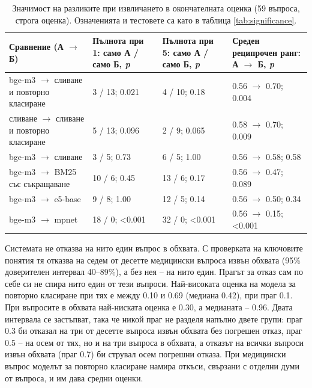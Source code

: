\documentclass[12pt,a4paper]{article}
\makeatletter
\renewcommand\paragraph{\@startsection{paragraph}{4}{\z@}{1.5ex \@plus .5ex \@minus .2ex}{-1em}{\normalfont\normalsize\bfseries}}
\makeatother
\begin{document}
\begin{table}[ht]
\centering
\small
\caption{Значимост на разликите при извличането в окончателната оценка (59 въпроса, строга оценка). Означенията и тестовете са като в таблица \ref{tab:significance}.}
\label{tab:final-significance}
\setlength{\tabcolsep}{4pt}
\begin{tabular}{L{0.36\textwidth}C{0.17\textwidth}C{0.17\textwidth}C{0.2\textwidth}}
\toprule
Сравнение (А $\rightarrow$ Б) & Пълнота при 1: само А / само Б, \textit{p} & Пълнота при 5: само А / само Б, \textit{p} & Среден реципрочен ранг: А $\rightarrow$ Б, \textit{p}\\
\midrule
bge-m3 $\rightarrow$ сливане и повторно класиране & 3 / 13; 0.021 & 4 / 10; 0.18 & 0.56 $\rightarrow$ 0.70; 0.004\\
сливане $\rightarrow$ сливане и повторно класиране & 5 / 13; 0.096 & 2 / 9; 0.065 & 0.58 $\rightarrow$ 0.70; 0.009\\
bge-m3 $\rightarrow$ сливане & 3 / 5; 0.73 & 6 / 5; 1.00 & 0.56 $\rightarrow$ 0.58; 0.58\\
bge-m3 $\rightarrow$ BM25 със съкращаване & 10 / 6; 0.45 & 13 / 6; 0.17 & 0.56 $\rightarrow$ 0.47; 0.089\\
bge-m3 $\rightarrow$ e5-base & 9 / 8; 1.00 & 12 / 5; 0.14 & 0.56 $\rightarrow$ 0.50; 0.34\\
bge-m3 $\rightarrow$ mpnet & 18 / 0; <0.001 & 32 / 0; <0.001 & 0.56 $\rightarrow$ 0.15; <0.001\\
\bottomrule
\end{tabular}
\end{table}

\paragraph{Откази.} Системата не отказва на нито един въпрос в обхвата. С проверката на ключовите понятия тя отказва на седем от десетте медицински въпроса извън обхвата (95\% доверителен интервал 40--89\%), а без нея -- на нито един. Прагът за отказ сам по себе си не спира нито един от тези въпроси. Най-високата оценка на модела за повторно класиране при тях е между 0.10 и 0.69 (медиана 0.42), при праг 0.1. При въпросите в обхвата най-ниската оценка е 0.30, а медианата -- 0.96. Двата интервала се застъпват, така че никой праг не разделя напълно двете групи: праг 0.3 би отказал на три от десетте въпроса извън обхвата без погрешен отказ, праг 0.5 -- на осем от тях, но и на три въпроса в обхвата, а отказът на всички въпроси извън обхвата (праг 0.7) би струвал осем погрешни отказа. При медицински въпрос моделът за повторно класиране намира откъси, свързани с отделни думи от въпроса, и им дава средни оценки.
\end{document}
